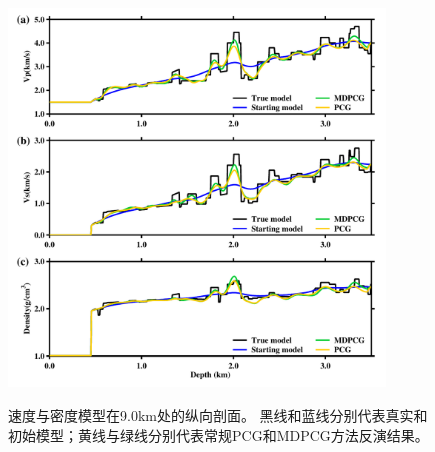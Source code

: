 \begin{figure}[!htb]
    \begin{center}
        {\includegraphics[width=10cm]{Figure/chapter02/tariqsugresult/Fig/9kmrho.pdf}}
        \caption{
			速度与密度模型在9.0km处的纵向剖面。
			黑线和蓝线分别代表真实和初始模型；黄线与绿线分别代表常规PCG和MDPCG方法反演结果。
    }
    \label{fig:RhoProfile9km}
    \end{center}
\end{figure} 
